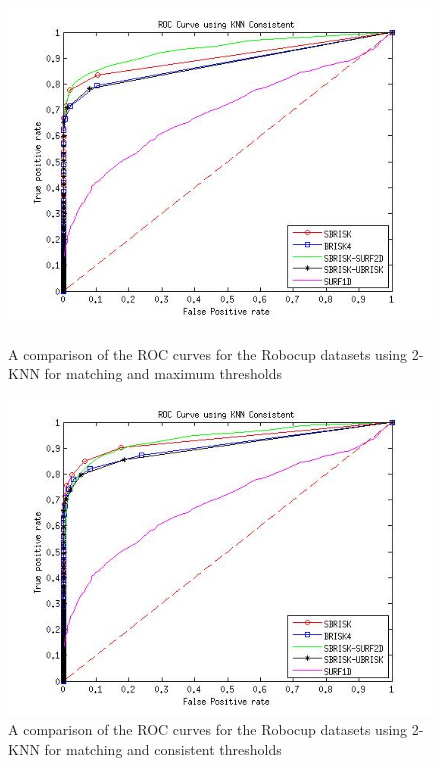 \documentclass{article}
\begin{document}
\begin{figure}[h!]
\begin{minipage}[b]{0.5\linewidth}
\end{minipage}
\begin{minipage}[b]{0.5\linewidth}
\includegraphics[scale=0.4]{../Drawings/ROC_General_KNN.jpg}
\caption{A comparison of the ROC curves for the Robocup datasets using 2-KNN for matching and maximum thresholds}
\label{fig:compareKNN}
\end{minipage}
\begin{minipage}[b]{0.5\linewidth}
\includegraphics[scale=0.4]{../Drawings/ROC_General_KNN_Consistent.jpg}
\caption{A comparison of the ROC curves for the Robocup datasets using 2-KNN for matching and consistent thresholds}
\label{fig:compareKNNConsistent}
\end{minipage}
\end{figure}
\end{document}
